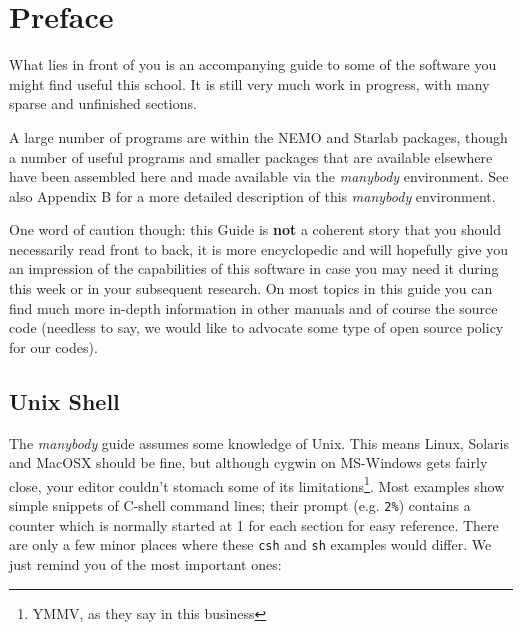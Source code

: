 \chapter*{Preface}

What lies in front of you is an accompanying guide to some of 
the software you might find useful this school.
It is still very much work in progress, with many sparse and
unfinished sections.


A large number of programs are within the NEMO and Starlab packages, 
though a number of useful programs and smaller packages
that are available elsewhere have been assembled here
and made available via the {\it manybody} environment.
See also Appendix B for a more detailed description of this
{\it manybody} environment.

One word of caution though: this Guide is {\bf not} a coherent
story that you should necessarily read front to back, it is more encyclopedic
and will hopefully give you an impression of the capabilities
of this software in case you may need it during this week or in
your subsequent research. On most topics in this guide you can find
much more in-depth information in other manuals and of course 
the source code (needless to say, we would like to advocate some
type of open source policy for our codes).

%

\section*{Unix Shell}

The {\it manybody} guide assumes some knowledge
of Unix. This means Linux, Solaris and MacOSX should be fine, 
but although cygwin on MS-Windows
gets fairly close, your editor couldn't stomach some of 
its limitations\footnote{YMMV, as they say in this business}.
Most examples show simple snippets
of C-shell command lines; their prompt (e.g. \verb+2%+) 
contains a counter which is normally started at 1 for each section
for easy reference.
There are only a few minor places where these {\tt csh} and 
{\tt sh} examples would differ. We just remind you of
the most important ones:

